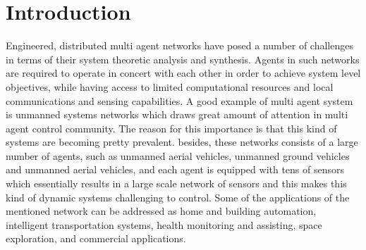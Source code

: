 \documentclass[conference]{IEEEtran}
\begin{document}
\section{Introduction}
Engineered, distributed multi agent networks have posed a number of challenges in terms of their system theoretic analysis and synthesis. Agents in such networks are required to operate in concert with each other in order to achieve system level objectives, while having access to limited computational resources and local communications and sensing capabilities.
A good example of multi agent system is unmanned systems networks which draws great amount of attention in multi agent control community. The reason for this importance is that this kind of systems are becoming pretty prevalent. besides, these networks consists of a large number of agents, such as unmanned aerial vehicles, unmanned ground vehicles and unmanned aerial vehicles, and each agent is equipped with tens of sensors which essentially results in a large scale network of sensors and this makes this kind of dynamic systems challenging to control. Some of the applications of the mentioned network can be addressed as home and building automation, intelligent transportation systems, health monitoring and assisting, space exploration, and commercial applications. \\
\end{document}
